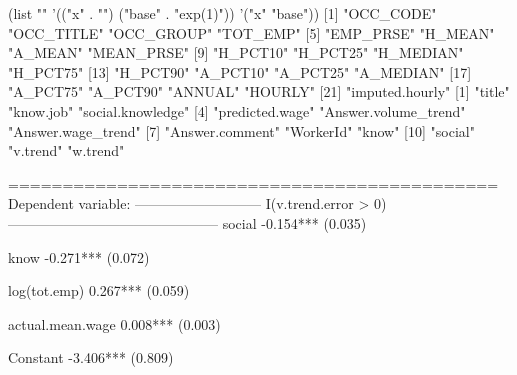 
(list "" '(("x" . "") ("base" . "exp(1)")) '("x" "base"))
 [1] "OCC_CODE"       "OCC_TITLE"      "OCC_GROUP"      "TOT_EMP"       
 [5] "EMP_PRSE"       "H_MEAN"         "A_MEAN"         "MEAN_PRSE"     
 [9] "H_PCT10"        "H_PCT25"        "H_MEDIAN"       "H_PCT75"       
[13] "H_PCT90"        "A_PCT10"        "A_PCT25"        "A_MEDIAN"      
[17] "A_PCT75"        "A_PCT90"        "ANNUAL"         "HOURLY"        
[21] "imputed.hourly"
 [1] "title"               "know.job"            "social.knowledge"   
 [4] "predicted.wage"      "Answer.volume_trend" "Answer.wage_trend"  
 [7] "Answer.comment"      "WorkerId"            "know"               
[10] "social"              "v.trend"             "w.trend"            

=============================================
                      Dependent variable:    
                  ---------------------------
                     I(v.trend.error > 0)    
---------------------------------------------
social                     -0.154***         
                            (0.035)          
                                             
know                       -0.271***         
                            (0.072)          
                                             
log(tot.emp)               0.267***          
                            (0.059)          
                                             
actual.mean.wage           0.008***          
                            (0.003)          
                                             
Constant                   -3.406***         
                            (0.809)          
                                             
